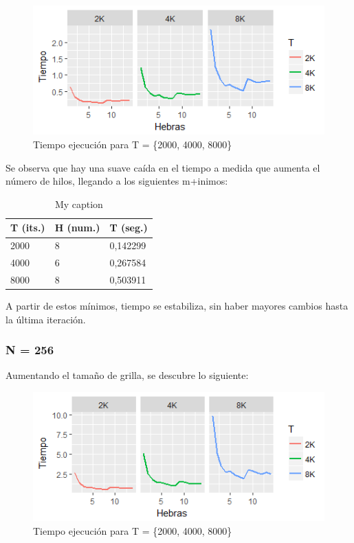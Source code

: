 \documentclass[jou]{apa6}
\begin{document}
\begin{figure}[h]
	\includegraphics[width=\columnwidth]{tiempo-128px.png}
	\caption{Tiempo ejecución para T = \{2000, 4000, 8000\}}
	\label{fig:Figure1}
\end{figure}

Se observa que hay una suave caída en el tiempo a medida que aumenta el número de hilos, llegando a los siguientes m+inimos: 

\begin{table}[]
\centering
\caption{My caption}
\label{my-label}
\begin{tabular}{@{}lll@{}}
\toprule
\multicolumn{1}{c}{T (its.)} & \multicolumn{1}{c}{H (num.)} & \multicolumn{1}{c}{T (seg.)} \\ \midrule
2000                         & 8                            & 0,142299                     \\
4000                         & 6                            & 0,267584                     \\
8000                         & 8                            & 0,503911                     \\ \bottomrule
\end{tabular}
\end{table}

A partir de estos mínimos, tiempo se estabiliza, sin haber mayores cambios hasta la última iteración.

\subsubsection{N = 256}
Aumentando el tamaño de grilla, se descubre lo siguiente:

\begin{figure}[h]
	\includegraphics[width=\columnwidth]{tiempo-256px.png}
	\caption{Tiempo ejecución para T = \{2000, 4000, 8000\}}
	\label{fig:Figure2}
\end{figure}
\end{document}
